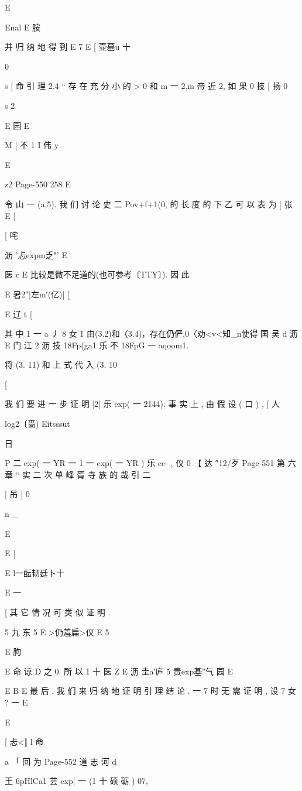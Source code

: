 {{E

Enal
E 胺

并 归 纳 地 得 到
E
7 E
[ 壶墓u 十

0

s
[ 命
引 理 2.4 “ 存 在 充 分 小 的 > 0 和 m 一 2,m 帝 近 2, 如 果
0 技
[ 扬
0

s
2

E 园
E

M
[ 不 1
I 伟 y

E

z2
Page-550
258 E

令 山 一 (a,5). 我 们 讨 论 史 二 Pov+f+1(0, 的 长 度 的 下
乙 可 以 表 为
[ 张
E [

[ 咤

沥 '忐expm乏"' E

医 c
E 比较是微不足道的(也可参考〔TTY〕). 因 此

E 暑2″|左m′(亿)| [

E 辽 t [

其 中 1 一 a 丿 8 女 1
由(3.2)和〈3.4)，存在仍俨,0〈劝<v<知_n使得
国 吴
d 沥
E 门 江 2 沥 技
18Fp(ga1 乐 不 18FpG 一 aqoom1.

将 (3. 11) 和 上 式 代 入 (3. 10

[

我 们 要 进 一 步 证 明 |2| 乐 exp( 一 2144). 事 实 上 , 由 假 设 ( 口 ) ,
[ 人

log2〔啬) Eitsssut

日

P 二 exp( 一 YR 一 1 一 exp( 一 YR ) 乐 ce- ,
仪 0 【 达 ″12/歹
Page-551
第 六 章 “ 实 二 次 单 峰 胥 寺 族 的 哉 引 二

[ 吊 ]
0

n _

E

E [

E
l一酝韧廷卜十

E 一

[
其 它 情 况 可 类 似 证 明 .

5 九 东 5
E >仍羞扁>仪 E
5

E 朐

E 命 谅
D 之 0. 所 以 1 十
医
Z
E 沥 圭a′庐 5 责exp基″气 园
E

E B
E
最 后 , 我 们 来 归 纳 地 证 明 引 理 结 论 . 一 7 时 无 需 证 明 , 设 7 女 ? 一
E

E

[
忐<‖ l 命

a 「
回 为
Page-552
道 志 河 d

王
6pHlCa1 芸 exp[ 一 (1 十 硕 砺 ) 07,

}}
